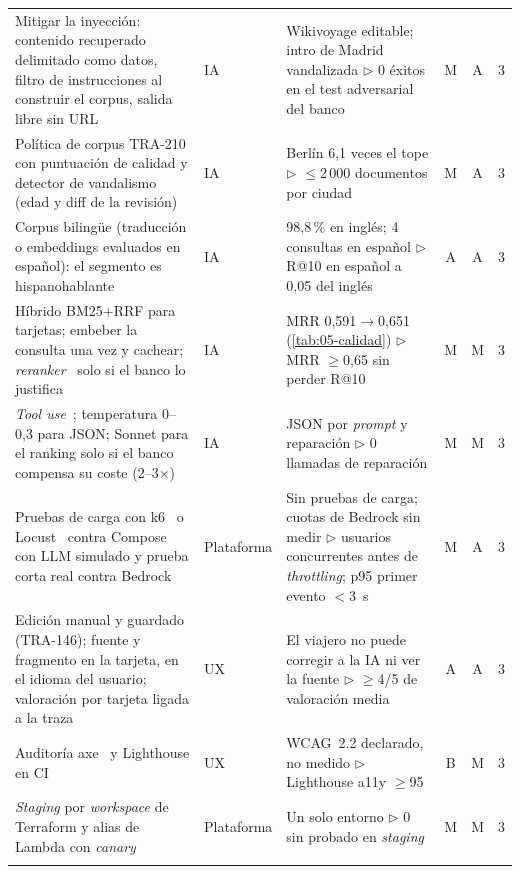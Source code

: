 \begin{table}[tb]
\begin{tabularx}{\textwidth}{@{}>{\raggedright\arraybackslash}p{7.2cm}lYccc@{}}
Mitigar la inyección: contenido recuperado delimitado como datos, filtro de instrucciones al construir el corpus, salida libre sin URL & IA & Wikivoyage editable; intro de Madrid vandalizada $\triangleright$ 0 éxitos en el test adversarial del banco & M & A & 3 \\
Política de corpus TRA-210 con puntuación de calidad y detector de vandalismo (edad y diff de la revisión) & IA & Berlín 6,1 veces el tope $\triangleright$ $\leq$2\,000 documentos por ciudad & M & A & 3 \\
Corpus bilingüe (traducción o embeddings evaluados en español): el segmento es hispanohablante & IA & 98,8\,\% en inglés; 4 consultas en español $\triangleright$ R@10 en español a 0,05 del inglés & A & A & 3 \\
Híbrido BM25+RRF para tarjetas; embeber la consulta una vez y cachear; \emph{reranker}~\cite{cr:bedrockrerank} solo si el banco lo justifica & IA & MRR 0,591$\to$0,651 (\cref{tab:05-calidad}) $\triangleright$ MRR $\geq$0,65 sin perder R@10 & M & M & 3 \\
\emph{Tool use}~\cite{cr:bedrocktooluse}; temperatura 0--0,3 para JSON; Sonnet para el ranking solo si el banco compensa su coste (2--3$\times$) & IA & JSON por \emph{prompt} y reparación $\triangleright$ 0 llamadas de reparación & M & M & 3 \\
Pruebas de carga con k6~\cite{fz:k6} o Locust~\cite{fz:locust} contra Compose con LLM simulado y prueba corta real contra Bedrock & Plataforma & Sin pruebas de carga; cuotas de Bedrock sin medir $\triangleright$ usuarios concurrentes antes de \emph{throttling}; p95 primer evento $<$3~s & M & A & 3 \\
Edición manual y guardado (TRA-146); fuente y fragmento en la tarjeta, en el idioma del usuario; valoración por tarjeta ligada a la traza & UX & El viajero no puede corregir a la IA ni ver la fuente $\triangleright$ $\geq$4/5 de valoración media & A & A & 3 \\
Auditoría axe~\cite{cr:axe} y Lighthouse en CI & UX & WCAG~2.2 declarado, no medido $\triangleright$ Lighthouse a11y $\geq$95 & B & M & 3 \\
\emph{Staging} por \emph{workspace} de Terraform y alias de Lambda con \emph{canary}~\cite{cr:codedeploy} & Plataforma & Un solo entorno $\triangleright$ 0  sin  probado en \emph{staging} & M & M & 3 \\
\midrule
{} \\

\end{tabularx}
\end{table}
